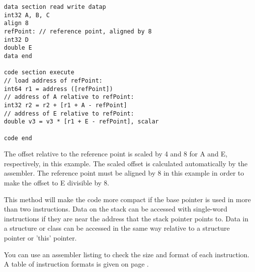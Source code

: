 \documentclass[forwardcom.tex]{subfiles}
\begin{document}
\begin{lstlisting}[frame=single]
data section read write datap
int32 A, B, C	
align 8
refPoint: // reference point, aligned by 8
int32 D
double E
data end

code section execute
// load address of refPoint:
int64 r1 = address ([refPoint])
// address of A relative to refPoint:
int32 r2 = r2 + [r1 + A - refPoint]
// address of E relative to refPoint:
double v3 = v3 * [r1 + E - refPoint], scalar

code end

\end{lstlisting}
\vv

The offset relative to the reference point is scaled by 4 and 8 for A and E, respectively, in this example. The scaled offset is calculated automatically by the assembler. The reference point must be aligned by 8 in this example in order to make the offset to E divisible by 8.
\vv

This method will make the code more compact if the base pointer is used in more than two instructions. Data on the stack can be accessed with single-word instructions if they are near the address that the stack pointer points to. Data in a structure or class can be accessed in the same way relative to a structure pointer or 'this' pointer.
\vv

You can use an assembler listing to check the size and format of each instruction. A table of instruction formats is given on page \pageref{table:instructionFormats}.
\vv
\end{document}
